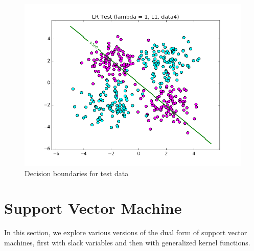 \documentclass{article}
\begin{document}
\begin{figure}[width=\linewidth]
\begin{multicols}{2}
  \includegraphics[width=1.2\linewidth]{Part1_data4_test.png}
\end{multicols}
\caption{Decision boundaries for test data}
\end{figure}


\section{Support Vector Machine}
In this section, we explore various versions of the dual form of support vector machines, first with slack variables and then with generalized kernel functions.
\end{document}
